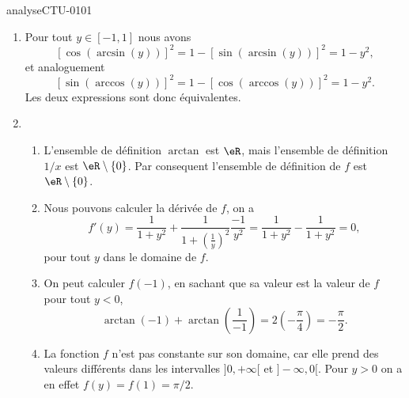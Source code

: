 
\begin{corrige}{analyseCTU-0101}

   \begin{enumerate}
      \item Pour tout $y \in [-1,1]$ nous avons 
        \begin{equation*}
          \left[\cos (\arcsin(y)) \right]^2 = 1 -  \left[\sin (\arcsin(y)) \right]^2 = 1- y^2,
        \end{equation*}
et analoguement 
 \begin{equation*}
          \left[ \sin(\arccos(y))\right]^2 = 1 -  \left[\cos(\arccos(y))\right]^2 = 1- y^2.
        \end{equation*}
 Les deux expressions sont donc équivalentes. 
        \item
            \begin{enumerate}
            \item L'ensemble de définition $\arctan$ est $\eR$, mais l'ensemble de  définition $1/x$ est $\eR\setminus\{0\}$. Par consequent l'ensemble de définition de $f$ est $\eR\setminus\{0\}$.
              \item Nous pouvons calculer la dérivée de $f$, on a  
                \begin{equation*}
                  f'(y) = \frac{1}{1+y^2} + \frac{1}{1+\left(\frac{1}{y}\right)^2}\frac{-1}{y^2} = \frac{1}{1+y^2} - \frac{1}{1+y^2} = 0,
                \end{equation*}
pour tout $y$ dans le domaine de $f$.
              \item On peut calculer $f(-1)$, en sachant que sa valeur est la valeur de $f$ pour tout \( y<0\),
            \begin{equation}
                \arctan(-1)+\arctan(\frac{1}{ -1 })= 2 \left(-\frac{ \pi }{ 4 }\right) = -\frac{ \pi }{ 2 }.
            \end{equation}
          \item La fonction $f$ n'est pas constante sur son domaine, car elle prend des valeurs diff\'erents dans les intervalles $]0,+\infty[$ et $]-\infty, 0[$. Pour $y>0$ on a en effet $f(y) = f(1) = \pi/2$.  
            \end{enumerate}
    \end{enumerate}

\end{corrige}
